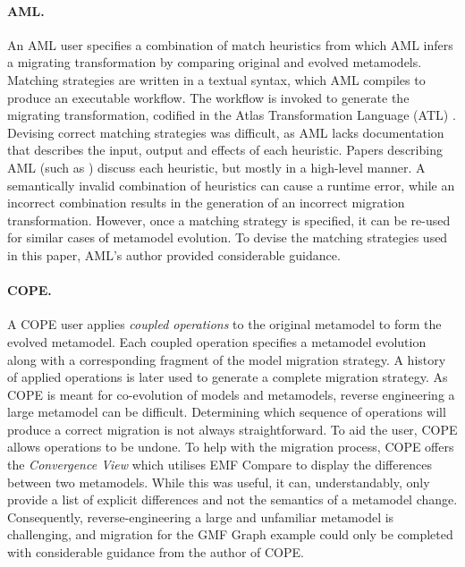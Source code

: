 \paragraph{AML.} An AML user specifies a combination of match heuristics from which AML infers a migrating transformation by comparing original and evolved metamodels. Matching strategies are written in a textual syntax, which AML compiles to produce an executable workflow. The workflow is invoked to generate the migrating transformation, codified in the Atlas Transformation Language (ATL) \cite{jouault05transforming}.
%
Devising correct matching strategies was difficult, as AML lacks documentation that describes the input, output and effects of each heuristic. Papers describing AML (such as \cite{garces09managing}) discuss each heuristic, but mostly in a high-level manner. A semantically invalid combination of heuristics can cause a runtime error, while an incorrect combination results in the generation of an incorrect migration transformation. However, once a matching strategy is specified, it can be re-used for similar cases of metamodel evolution. To devise the matching strategies used in this paper, AML's author provided considerable guidance.

\paragraph{COPE.} A COPE user applies \emph{coupled operations} to the original metamodel to form the evolved metamodel. Each coupled operation specifies a metamodel evolution along with a corresponding fragment of the model migration strategy. A history of applied operations is later used to generate a complete migration strategy.
%
As COPE is meant for co-evolution of models and metamodels, reverse engineering a large metamodel can be difficult. Determining which sequence of operations will produce a correct migration is not always straightforward. To aid the user, COPE allows operations to be undone.
%
To help with the migration process, COPE offers the \emph{Convergence View} which utilises EMF Compare to display the differences between two metamodels. While this was useful, it can, understandably, only provide a list of explicit differences and not the semantics of a metamodel change. Consequently, reverse-engineering a large and unfamiliar metamodel is challenging, and migration for the GMF Graph example could only be completed with considerable guidance from the author of COPE. %

